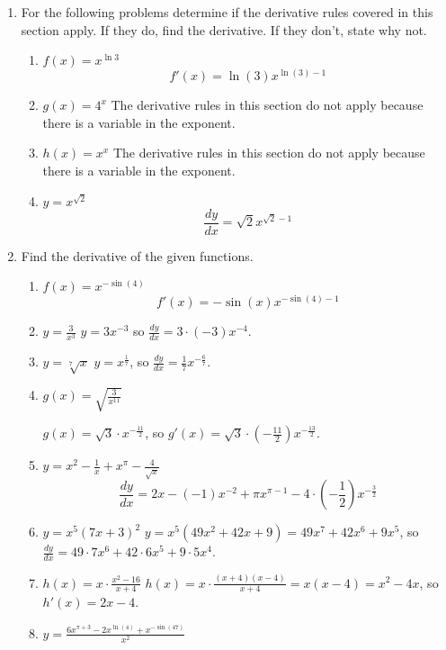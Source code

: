 \documentclass[11pt]{article}
\newcommand{\ds}{\displaystyle}
\begin{document}
\drawtitle
\begin{enumerate}
\item For the following problems determine if the derivative rules
  covered in this section apply.  If they do, find the derivative.  If
  they don't, state why not.
  \begin{enumerate}
  \item $f(x)=x^{\ln{3}}$
    \vfill
    {\color{blue}
      \[
      f'(x) = \ln(3)x^{\ln(3)-1}
      \]
    }
    \vfill
  \item $g(x)=4^x$
    \vfill
    {\color{blue} The derivative rules in this section do not apply
      because there is a variable in the exponent.  }
    \vfill
  \item $h(x)=x^x$
    \vfill
    {\color{blue} The derivative rules in this section do not apply
      because there is a variable in the exponent.  }
    \vfill
  \item $y=x^{\sqrt{2}}$
    \vfill
    {\color{blue}
      \[
      \frac{dy}{dx} = \sqrt{2} x^{\sqrt{2}-1}
      \]
    }
    \vfill
  \end{enumerate}
\newpage  

\item Find the derivative of the given functions.
  \begin{enumerate}
  \item $f(x)=x^{-\sin(4)}$
    \vfill
    {\color{blue}
      \[
      f'(x) = -\sin(x)x^{-\sin(4)-1}
      \]
    }
    \vfill
  \item $\ds y=\frac{3}{x^3}$
    \vfill
    {\color{blue}
      $y = 3x^{-3}$ so $\frac{dy}{dx} = 3\cdot(-3)x^{-4}$.
    }
    \vfill
  \item $y=\sqrt[7]{x}$
    \vfill
    {\color{blue}
      $y = x^{\frac{1}{7}}$, so $\frac{dy}{dx} = \frac{1}{7}x^{-\frac{6}{7}}$.
    }
    \vfill
  \item $\ds g(x)=\sqrt{\frac{3}{x^{11}}}$
    \vfill

    {\color{blue} $g(x) = \sqrt{3}\cdot x^{-\frac{11}{2}}$, so $g'(x)
      = \sqrt{3}\cdot \left(-\frac{11}{2}\right)x^{-\frac{13}{2}}$.}

    \vfill
    \newpage
  \item $\ds y=x^2-\frac{1}{x}+x^\pi-\frac{4}{\sqrt{x}}$
    \vfill
    {\color{blue}
      \[
      \frac{dy}{dx} = 2x-(-1)x^{-2} + \pi
      x^{\pi-1}-4\cdot\left(-\frac{1}{2}\right)x^{-\frac{3}{2}}
      \]
    }
    \vfill
  \item $y=x^{5}(7x+3)^2$
    \vfill
    {\color{blue}
      $y = x^5(49x^2+42x+9) = 49x^7+42x^6+9x^5$, so $\frac{dy}{dx} =
      49\cdot 7x^6 + 42\cdot 6 x^5 + 9\cdot 5 x^4$.
    }
    \vfill
  \item $\ds h(x)=x\cdot\frac{x^2-16}{x+4}$
    \vfill
    {\color{blue}
      $h(x) = x\cdot\frac{(x+4)(x-4)}{x+4} = x(x-4) = x^2-4x$, so
      $h'(x) = 2x-4$.
    }
    \vfill
  \item $\ds y=\frac{6x^{\pi+3}-2x^{\ln(4)}+x^{-\sin(47)}}{x^2}$
    \vfill
    {\color{blue}

}
\end{enumerate}
\end{enumerate}
\end{document}
